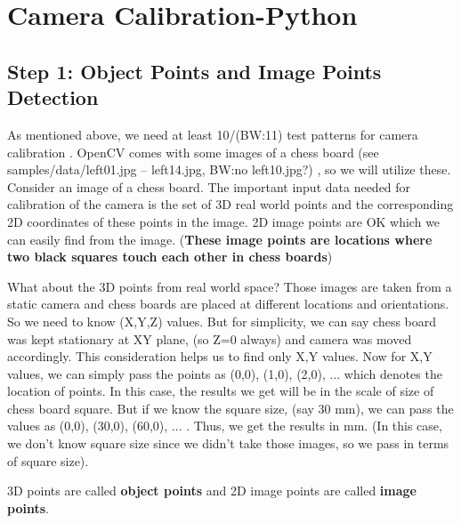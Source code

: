 \documentclass{article}
\begin{document}
\section{Camera Calibration-Python}
\label{sec:cc_python}

\subsection{Step 1: Object Points and Image Points Detection}
\label{ssec: 1_obj_p_and_img_p_detect}

As mentioned above, we need at least 10/(BW:11) test patterns for camera calibration \cite{ref_OpenCV_camera_calibration}. OpenCV comes with some images of a chess board (see samples/data/left01.jpg – left14.jpg, BW:no left10.jpg?) \cite{ref_OpenCV_chessboard_sample}, so we will utilize these. Consider an image of a chess board. The important input data needed for calibration of the camera is the set of 3D real world points and the corresponding 2D coordinates of these points in the image. 2D image points are OK which we can easily find from the image. (\textbf{These image points are locations where two black squares touch each other in chess boards})

What about the 3D points from real world space? Those images are taken from a static camera and chess boards are placed at different locations and orientations. So we need to know (X,Y,Z) values. But for simplicity, we can say chess board was kept stationary at XY plane, (so Z=0 always) and camera was moved accordingly. This consideration helps us to find only X,Y values. Now for X,Y values, we can simply pass the points as (0,0), (1,0), (2,0), ... which denotes the location of points. In this case, the results we get will be in the scale of size of chess board square. But if we know the square size, (say 30 mm), we can pass the values as (0,0), (30,0), (60,0), ... . Thus, we get the results in mm. (In this case, we don't know square size since we didn't take those images, so we pass in terms of square size).

3D points are called \textbf{object points} and 2D image points are called \textbf{image points}.
\end{document}
